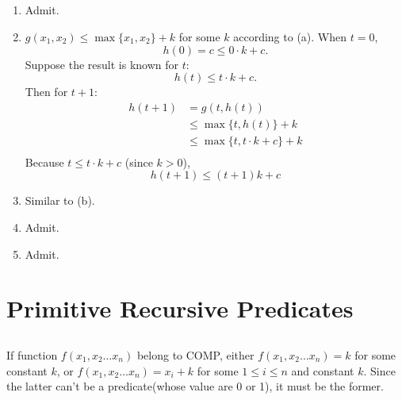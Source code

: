 \subsection{}
\begin{enumerate}
  \item Admit.

  \item
  $ g(x_{1}, x_{2}) \le \max\{x_{1}, x_{2}\} + k $ for some $k$ according to (a).
  When $ t = 0 $,
  \[ h(0) = c \le 0 \cdot k + c .\]
  Suppose the result is known for $ t $:
  \[ h(t) \le t \cdot k + c .\]
  Then for $ t+1 $:
  \begin{align*}
    h(t+1) & = g(t, h(t)) \\
           & \le \max\{t, h(t)\} + k \\
           & \le \max\{t, t \cdot k + c\} + k \\
  \end{align*}
  Because $ t \le t \cdot k + c $ (since $k>0$),
  \[ h(t+1) \le (t+1)k+c \]

  \item Similar to (b).
  \item Admit.
  \item Admit.
\end{enumerate}



\section{Primitive Recursive Predicates}

\subsection{}
If function $f(x_{1}, x_{2} \dots x_{n})$ belong to COMP, 
either $f(x_{1}, x_{2} \dots x_{n}) = k$ for some constant $k$,
or $f(x_{1}, x_{2} \dots x_{n}) = x_{i}+k$ for some $1\le i\le n$ and constant $k$.
Since the latter can't be a predicate(whose value are 0 or 1), it must be the former.
